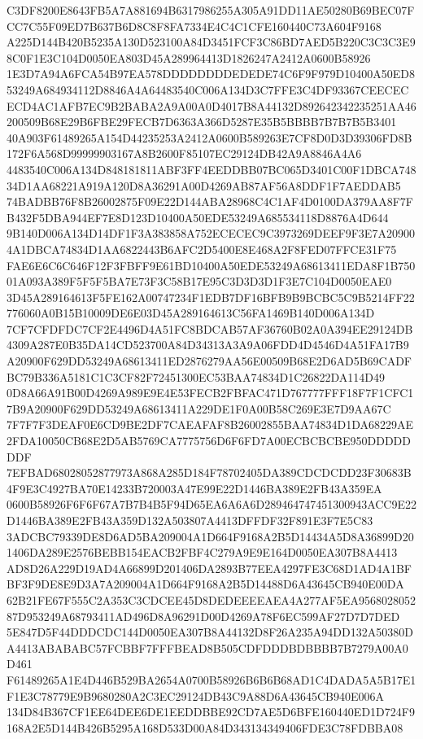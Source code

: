 \documentclass[UTF8,fontset=fandol,zihao=-4,a4paper]{ctexart}
\begin{document}
{{C3DF8200E8643FB5A7A881694B6317986255A305A91DD11AE50280B69BEC07FCC7C55F09ED7B637B6D8C8F8FA7334E4C4C1CFE160440C73A604F9168
A225D144B420B5235A130D523100A84D3451FCF3C86BD7AED5B220C3C3C3E98C0F1E3C104D0050EA803D45A289964413D1826247A2412A0600B58926
1E3D7A94A6FCA54B97EA578DDDDDDDDEDEDE74C6F9F979D10400A50ED853249A684934112D8846A4A64483540C006A134D3C7FFE3C4DF93367CEECEC
ECD4AC1AFB7EC9B2BABA2A9A00A0D4017B8A44132D892642342235251AA46200509B68E29B6FBE29FECB7D6363A366D5287E35B5BBBB7B7B7B5B3401
40A903F61489265A154D44235253A2412A0600B589263E7CF8D0D3D39306FD8B172F6A568D99999903167A8B2600F85107EC29124DB42A9A8846A4A6
4483540C006A134D848181811ABF3FF4EEDDBB07BC065D3401C00F1DBCA74834D1AA68221A919A120D8A36291A00D4269AB87AF56A8DDF1F7AEDDAB5
74BADBB76F8B26002875F09E22D144ABA28968C4C1AF4D0100DA379AA8F7FB432F5DBA944EF7E8D123D10400A50EDE53249A685534118D8876A4D644
9B140D006A134D14DF1F3A383858A752ECECEC9C3973269DEEF9F3E7A209004A1DBCA74834D1AA6822443B6AFC2D5400E8E468A2F8FED07FFCE31F75
FAE6E6C6C646F12F3FBFF9E61BD10400A50EDE53249A68613411EDA8F1B75001A093A389F5F5F5BA7E73F3C58B17E95C3D3D3D1F3E7C104D0050EAE0
3D45A289164613F5FE162A00747234F1EDB7DF16BFB9B9BCBC5C9B5214FF22776060A0B15B10009DE6E03D45A289164613C56FA1469B140D006A134D
7CF7CFDFDC7CF2E4496D4A51FC8BDCAB57AF36760B02A0A394EE29124DB4309A287E0B35DA14CD523700A84D34313A3A9A06FDD4D4546D4A51FA17B9
A20900F629DD53249A68613411ED2876279AA56E00509B68E2D6AD5B69CADFBC79B336A5181C1C3CF82F72451300EC53BAA74834D1C26822DA114D49
0D8A66A91B00D4269A989E9E4E53FECB2FBFAC471D767777FFF18F7F1CFC17B9A20900F629DD53249A68613411A229DE1F0A00B58C269E3E7D9AA67C
7F7F7F3DEAF0E6CD9BE2DF7CAEAFAF8B26002855BAA74834D1DA68229AE2FDA10050CB68E2D5AB5769CA7775756D6F6FD7A00ECBCBCBE950DDDDDDDF
7EFBAD68028052877973A868A285D184F78702405DA389CDCDCDD23F30683B4F9E3C4927BA70E14233B720003A47E99E22D1446BA389E2FB43A359EA
0600B58926F6F6F67A7B7B4B5F94D65EA6A6A6D289464747451300943ACC9E22D1446BA389E2FB43A359D132A503807A4413DFFDF32F891E3F7E5C83
3ADCBC79339DE8D6AD5BA209004A1D664F9168A2B5D14434A5D8A36899D201406DA289E2576BEBB154EACB2FBF4C279A9E9E164D0050EA307B8A4413
AD8D26A229D19AD4A66899D201406DA2893B77EEA4297FE3C68D1AD4A1BFBF3F9DE8E9D3A7A209004A1D664F9168A2B5D14488D6A43645CB940E00DA
62B21FE67F555C2A353C3CDCEE45D8DEDEEEEAEA4A277AF5EA956802805287D953249A68793411AD496D8A96291D00D4269A78F6EC599AF27D7D7DED
5E847D5F44DDDCDC144D0050EA307B8A44132D8F26A235A94DD132A50380DA4413ABABABC57FCBBF7FFFBEAD8B505CDFDDDBDBBBB7B7279A00A0D461
F61489265A1E4D446B529BA2654A0700B58926B6B6B68AD1C4DADA5A5B17E1F1E3C78779E9B9680280A2C3EC29124DB43C9A88D6A43645CB940E006A
134D84B367CF1EE64DEE6DE1EEDDBBE92CD7AE5D6BFE160440ED1D724F9168A2E5D144B426B5295A168D533D00A84D343134349406FDE3C78FDBBA08
}}
\end{document}
